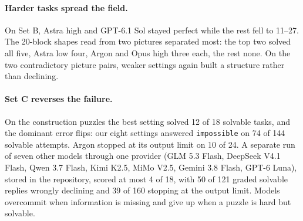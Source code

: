 \documentclass[10pt,twocolumn,letterpaper]{article}
\begin{document}
\paragraph{Harder tasks spread the field.} On Set B, Astra high and GPT-6.1 Sol stayed perfect while the rest fell to 11--27. The 20-block shapes read from two pictures separated most: the top two solved all five, Astra low four, Argon and Opus high three each, the rest none. On the two contradictory picture pairs, weaker settings again built a structure rather than declining.

\paragraph{Set C reverses the failure.} On the construction puzzles the best setting solved 12 of 18 solvable tasks, and the dominant error flips: our eight settings answered \texttt{impossible} on 74 of 144 solvable attempts. Argon stopped at its output limit on 10 of 24. A separate run of seven other models through one provider (GLM 5.3 Flash, DeepSeek V4.1 Flash, Qwen 3.7 Flash, Kimi K2.5, MiMo V2.5, Gemini 3.8 Flash, GPT-6 Luna), stored in the repository, scored at most 4 of 18, with 50 of 121 graded solvable replies wrongly declining and 39 of 160 stopping at the output limit. Models overcommit when information is missing and give up when a puzzle is hard but solvable.
\end{document}
